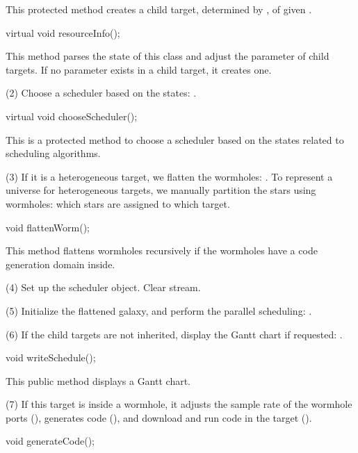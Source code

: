 This protected method creates a child target, determined by
, of given .

\begin{example}
virtual void resourceInfo();
\end{example}

This method parses the  state of this class and adjust the
 parameter of child targets. If no  parameter
exists in a child target, it creates one.

(2) Choose a scheduler based on the states: .

\begin{example}
virtual void chooseScheduler();
\end{example}

This is a protected method to choose a scheduler based on the states
related to scheduling algorithms.

(3) If it is a heterogeneous target, we flatten the wormholes:
. To represent a universe for heterogeneous targets,
we manually partition the stars using wormholes: which stars are assigned
to which target. 

\begin{example}
void flattenWorm();
\end{example}

This method flattens wormholes recursively if the wormholes have
a code generation domain inside.

(4) Set up the scheduler object. Clear  stream.

(5) Initialize the flattened galaxy, and perform the parallel scheduling:
.

(6) If the child targets are not inherited, display the Gantt chart if
requested: .

\begin{example}
void writeSchedule();
\end{example}

This public method displays a Gantt chart.

(7) If this target is inside a wormhole, it adjusts the sample rate of the
wormhole ports (), generates code
(), and download and run code in the target
().

\begin{example}
void generateCode();
\end{example}

